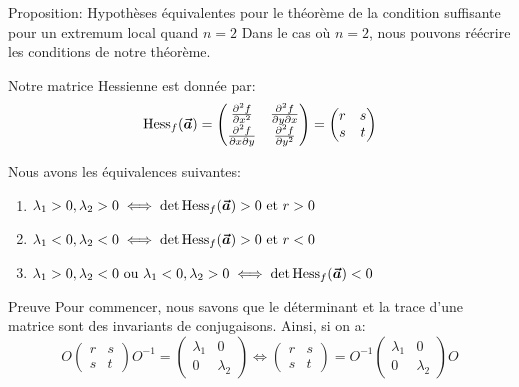 \documentclass[a4paper]{article}
\begin{document}
\begin{parag}{Proposition: Hypothèses équivalentes pour le théorème de la condition suffisante pour un extremum local quand $n = 2$}
    Dans le cas où $n = 2$, nous pouvons réécrire les conditions de notre théorème. 

    Notre matrice Hessienne est donnée par: 
    \[\Hess_f\left(\bvec{a}\right) = \begin{pmatrix} \frac{\partial^{2} f}{\partial x^{2}} & \frac{\partial^2 f}{\partial y \partial x} \\ \frac{\partial^2 f}{\partial x \partial y} & \frac{\partial^{2} f}{\partial y^{2}}  \end{pmatrix} = \begin{pmatrix} r & s \\ s & t \end{pmatrix} \]
    
    Nous avons les équivalences suivantes:
    \begin{enumerate}
        \item $\lambda_1 > 0, \lambda_2 > 0 \iff \det \Hess_f\left(\bvec{a}\right) > 0 \text{ et } r > 0$ 
        \item $\lambda_1 < 0, \lambda_2 < 0 \iff \det \Hess_f\left(\bvec{a}\right) > 0 \text{ et } r < 0$ 
        \item $\lambda_1 > 0, \lambda_2 < 0 \text{ ou } \lambda_1 < 0, \lambda_2 > 0 \iff \det \Hess_f\left(\bvec{a}\right) < 0$ 
    \end{enumerate}

    \demonstrationaconnaitre

    \begin{subparag}{Preuve}
        Pour commencer, nous savons que le déterminant et la trace d'une matrice sont des invariants de conjugaisons. Ainsi, si on a: 
        \[O \begin{pmatrix} r & s \\ s & t \end{pmatrix} O^{-1} = \begin{pmatrix} \lambda_1 & 0 \\ 0 & \lambda_2 \end{pmatrix} \iff \begin{pmatrix} r & s \\ s & t \end{pmatrix} = O^{-1} \begin{pmatrix} \lambda_1 & 0 \\ 0 & \lambda_2 \end{pmatrix} O\]
        

\end{subparag}
\end{parag}
\end{document}
